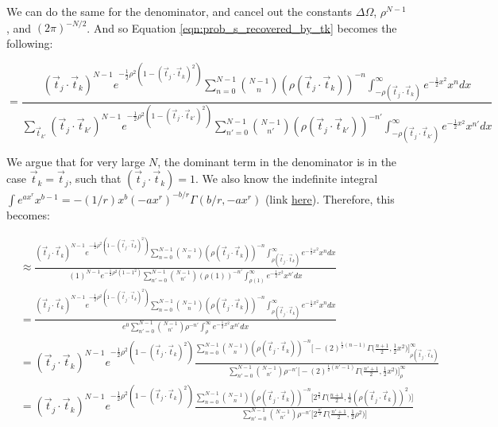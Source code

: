 \documentclass[12pt]{article}
\newcommand{\ptjtk}{\rho(\vec{t}_j\cdot\vec{t}_k)}
\newcommand{\tjtk}{(\vec{t}_j\cdot\vec{t}_k)}
\newcommand{\tjtkk}{(\vec{t}_j\cdot\vec{t}_{k'})}
\newcommand{\ptjtkk}{\rho(\vec{t}_j\cdot\vec{t}_{k'})}
\begin{document}
We can do the same for the denominator, and cancel out the constants $\Delta\Omega$, $\rho^{N-1}$, and $(2\pi)^{-N/2}$. And so Equation \ref{eqn:prob_s_recovered_by_tk} becomes the following:
   
   \begin{equation}
   =  \frac{ \tjtk^{N-1}e^{-\frac{1}{2}\rho^2(1-\tjtk^2)} \sum_{n=0}^{N-1} \binom{N-1}{n} (\ptjtk)^{-n} \int^{\infty}_{-\ptjtk} e^{-\frac{1}{2}x^2}x^n dx} { \sum_{\vec{t}_{k'}} \tjtkk^{N-1}e^{-\frac{1}{2}\rho^2(1-\tjtkk^2)} \sum_{n'=0}^{N-1} \binom{N-1}{n'} (\ptjtkk)^{-n'} \int^{\infty}_{-\ptjtkk} e^{-\frac{1}{2}x^2}x^{n'} dx}
   \end{equation}

We argue that for very large $N$, the dominant term in the denominator is in the case $\vec{t}_k = \vec{t}_j$, such that $\tjtk = 1$. We also know the indefinite integral $\int e^{ax^r}x^{b-1} = -(1/r) x^b (-ax^r)^{-b/r} \Gamma(b/r,-ax^r)$ (link \href{http://functions.wolfram.com/ElementaryFunctions/Exp/21/01/02/01/01/08/0001/}{here}). Therefore, this becomes:

   \begin{align}
   &\approx  \frac{ \tjtk^{N-1}e^{-\frac{1}{2}\rho^2(1-\tjtk^2)} \sum_{n=0}^{N-1} \binom{N-1}{n} (\ptjtk)^{-n} \int^{\infty}_{\ptjtk} e^{-\frac{1}{2}x^2}x^n dx} 
   { (1)^{N-1}e^{-\frac{1}{2}\rho^2(1-1^2)} \sum_{n'=0}^{N-1} \binom{N-1}{n'} (\rho(1))^{-n'} \int^{\infty}_{\rho(1)} e^{-\frac{1}{2}x^2}x^{n'} dx} \\
   &= \frac{ \tjtk^{N-1}e^{-\frac{1}{2}\rho^2(1-\tjtk^2)} \sum_{n=0}^{N-1} \binom{N-1}{n} (\ptjtk)^{-n} \int^{\infty}_{\ptjtk} e^{-\frac{1}{2}x^2}x^n dx} 
   { e^0\sum_{n'=0}^{N-1} \binom{N-1}{n'} \rho^{-n'} \int^{\infty}_{\rho} e^{-\frac{1}{2}x^2}x^{n'} dx} \\
   &= \tjtk^{N-1}e^{-\frac{1}{2}\rho^2(1-\tjtk^2)} \frac{ \sum_{n=0}^{N-1} \binom{N-1}{n} (\ptjtk)^{-n} \Big[ -(2)^{\frac{1}{2}(n-1)}\Gamma\Big(\frac{n+1}{2},\frac{1}{2}x^2\Big) \Big]^{\infty}_{\ptjtk} } 
   { \sum_{n'=0}^{N-1} \binom{N-1}{n'} \rho^{-n'}  \Big[ -(2)^{\frac{1}{2}(n'-1)}\Gamma\Big(\frac{n'+1}{2},\frac{1}{2}x^2\Big) \Big]^{\infty}_{\rho} } \\
   &= \tjtk^{N-1}e^{-\frac{1}{2}\rho^2(1-\tjtk^2)} \frac{ \sum_{n=0}^{N-1} \binom{N-1}{n} (\ptjtk)^{-n} \Big[ 2^{\frac{n}{2}}\Gamma\Big(\frac{n+1}{2},\frac{1}{2}(\ptjtk)^2\Big) \Big]} 
   { \sum_{n'=0}^{N-1} \binom{N-1}{n'} \rho^{-n'}  \Big[ 2^{\frac{n'}{2}}\Gamma\Big(\frac{n'+1}{2},\frac{1}{2}\rho^2\Big) \Big] }
   \end{align}
   
\end{document}
